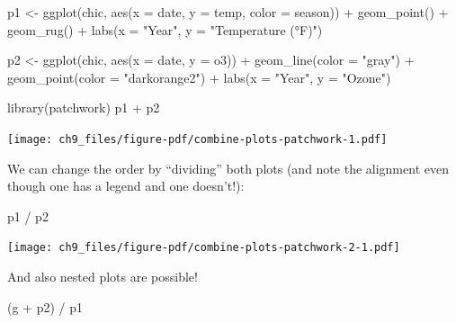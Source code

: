\documentclass[
  letterpaper,
  DIV=11,
  numbers=noendperiod]{scrreprt}
\newenvironment{Shaded}{\begin{snugshade}}{\end{snugshade}}
\newcommand{\AttributeTok}[1]{\textcolor[rgb]{0.40,0.45,0.13}{#1}}
\newcommand{\FunctionTok}[1]{\textcolor[rgb]{0.28,0.35,0.67}{#1}}
\newcommand{\NormalTok}[1]{\textcolor[rgb]{0.00,0.23,0.31}{#1}}
\newcommand{\OtherTok}[1]{\textcolor[rgb]{0.00,0.23,0.31}{#1}}
\newcommand{\SpecialCharTok}[1]{\textcolor[rgb]{0.37,0.37,0.37}{#1}}
\newcommand{\StringTok}[1]{\textcolor[rgb]{0.13,0.47,0.30}{#1}}
\begin{document}
\begin{Shaded}
\begin{Highlighting}[]
\NormalTok{p1 }\OtherTok{\textless{}{-}} \FunctionTok{ggplot}\NormalTok{(chic, }\FunctionTok{aes}\NormalTok{(}\AttributeTok{x =}\NormalTok{ date, }\AttributeTok{y =}\NormalTok{ temp,}
                       \AttributeTok{color =}\NormalTok{ season)) }\SpecialCharTok{+}
        \FunctionTok{geom\_point}\NormalTok{() }\SpecialCharTok{+}
        \FunctionTok{geom\_rug}\NormalTok{() }\SpecialCharTok{+}
        \FunctionTok{labs}\NormalTok{(}\AttributeTok{x =} \StringTok{"Year"}\NormalTok{, }\AttributeTok{y =} \StringTok{"Temperature (°F)"}\NormalTok{)}

\NormalTok{p2 }\OtherTok{\textless{}{-}} \FunctionTok{ggplot}\NormalTok{(chic, }\FunctionTok{aes}\NormalTok{(}\AttributeTok{x =}\NormalTok{ date, }\AttributeTok{y =}\NormalTok{ o3)) }\SpecialCharTok{+}
        \FunctionTok{geom\_line}\NormalTok{(}\AttributeTok{color =} \StringTok{"gray"}\NormalTok{) }\SpecialCharTok{+}
        \FunctionTok{geom\_point}\NormalTok{(}\AttributeTok{color =} \StringTok{"darkorange2"}\NormalTok{) }\SpecialCharTok{+}
        \FunctionTok{labs}\NormalTok{(}\AttributeTok{x =} \StringTok{"Year"}\NormalTok{, }\AttributeTok{y =} \StringTok{"Ozone"}\NormalTok{)}

\FunctionTok{library}\NormalTok{(patchwork)}
\NormalTok{p1 }\SpecialCharTok{+}\NormalTok{ p2}
\end{Highlighting}
\end{Shaded}

\texttt{[image: ch9\_files/figure-pdf/combine-plots-patchwork-1.pdf]}

We can change the order by ``dividing'' both plots (and note the
alignment even though one has a legend and one doesn't!):

\begin{Shaded}
\begin{Highlighting}[]
\NormalTok{p1 }\SpecialCharTok{/}\NormalTok{ p2}
\end{Highlighting}
\end{Shaded}

\texttt{[image: ch9\_files/figure-pdf/combine-plots-patchwork-2-1.pdf]}

And also nested plots are possible!

\begin{Shaded}
\begin{Highlighting}[]
\NormalTok{(g }\SpecialCharTok{+}\NormalTok{ p2) }\SpecialCharTok{/}\NormalTok{ p1}
\end{Highlighting}
\end{Shaded}
\end{document}
